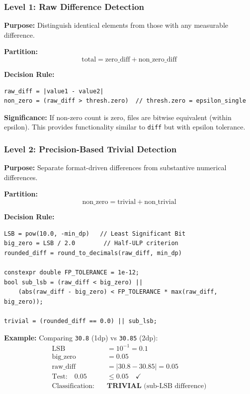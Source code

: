 \documentclass[11pt,letterpaper]{article}
\newcommand{\LSB}{\mathrm{LSB}}
\begin{document}
\subsubsection{Level 1: Raw Difference Detection}

\textbf{Purpose:} Distinguish identical elements from those with any measurable difference.

\textbf{Partition:}
\begin{equation}
    \text{total} = \text{zero\_diff} + \text{non\_zero\_diff}
\end{equation}

\textbf{Decision Rule:}
\begin{verbatim}
raw_diff = |value1 - value2|
non_zero = (raw_diff > thresh.zero)  // thresh.zero = epsilon_single
\end{verbatim}

\textbf{Significance:} If non-zero count is zero, files are bitwise equivalent (within epsilon). This provides functionality similar to \texttt{diff} but with epsilon tolerance.

\subsubsection{Level 2: Precision-Based Trivial Detection}

\textbf{Purpose:} Separate format-driven differences from substantive numerical differences.

\textbf{Partition:}
\begin{equation}
    \text{non\_zero} = \text{trivial} + \text{non\_trivial}
\end{equation}

\textbf{Decision Rule:}
\begin{verbatim}
LSB = pow(10.0, -min_dp)   // Least Significant Bit
big_zero = LSB / 2.0        // Half-ULP criterion
rounded_diff = round_to_decimals(raw_diff, min_dp)

constexpr double FP_TOLERANCE = 1e-12;
bool sub_lsb = (raw_diff < big_zero) ||
    (abs(raw_diff - big_zero) < FP_TOLERANCE * max(raw_diff, big_zero));

trivial = (rounded_diff == 0.0) || sub_lsb;
\end{verbatim}

\textbf{Example:} Comparing \texttt{30.8} (1dp) vs \texttt{30.85} (2dp):
\begin{align*}
    \LSB &= 10^{-1} = 0.1 \\
    \text{big\_zero} &= 0.05 \\
    \text{raw\_diff} &= |30.8 - 30.85| = 0.05 \\
    \text{Test:} \quad 0.05 &\leq 0.05 \quad \checkmark \\
    \text{Classification:} \quad & \textbf{TRIVIAL} \text{ (sub-LSB difference)}
\end{align*}
\end{document}
